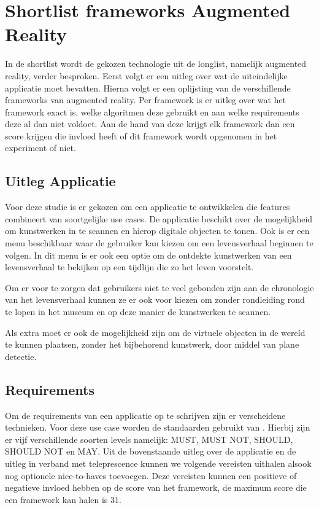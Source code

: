 \chapter{Shortlist frameworks Augmented Reality}
\label{ch:shortlist}

In de shortlist wordt de gekozen technologie uit de longlist, namelijk augmented reality, verder besproken.
Eerst volgt er een uitleg over wat de uiteindelijke applicatie moet bevatten.
Hierna volgt er een oplijsting van de verschillende frameworks van augmented reality. Per framework is er uitleg over wat het framework exact is, welke algoritmen deze gebruikt en aan welke requirements deze al dan niet voldoet. Aan de hand van deze krijgt elk framework dan een score krijgen die invloed heeft of dit framework wordt opgenomen in het experiment of niet.

\section{Uitleg Applicatie}
Voor deze studie is er gekozen om een applicatie te ontwikkelen die features combineert van soortgelijke use cases. De applicatie beschikt over de mogelijkheid om kunstwerken in te scannen en hierop digitale objecten te tonen. Ook is er een menu beschikbaar waar de gebruiker kan kiezen om een levensverhaal beginnen te volgen. In dit menu is er ook een optie om de ontdekte kunstwerken van een levensverhaal te bekijken op een tijdlijn die zo het leven voorstelt.

Om er voor te zorgen dat gebruikers niet te veel gebonden zijn aan de chronologie van het levensverhaal kunnen ze er ook voor kiezen om zonder rondleiding rond te lopen in het museum en op deze manier de kunstwerken te scannen.

Als extra moet er ook de mogelijkheid zijn om de virtuele objecten in de wereld te kunnen plaatsen, zonder het bijbehorend kunstwerk, door middel van plane detectie.

\section{Requirements}
Om de requirements van een applicatie op te schrijven zijn er verscheidene technieken. Voor deze use case worden de standaarden gebruikt van \textcite{Bradner1997}. Hierbij zijn er vijf verschillende soorten levels namelijk: MUST, MUST NOT, SHOULD, SHOULD NOT en MAY. Uit de bovenstaande uitleg over de applicatie en de uitleg in verband met teleprescence kunnen we volgende vereisten uithalen alsook nog optionele nice-to-haves toevoegen. Deze vereisten kunnen een positieve of negatieve invloed hebben op de score van het framework, de maximum score die een framework kan halen is 31.

